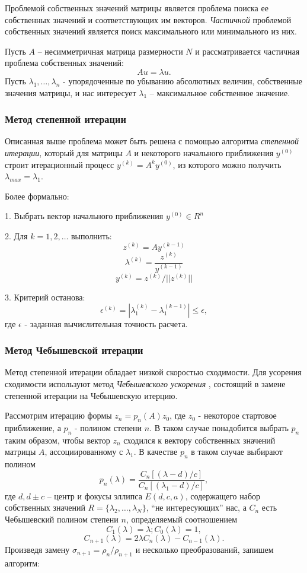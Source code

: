 \documentclass[12pt]{article}
\begin{document}
	Проблемой собственных значений матрицы является проблема поиска ее собственных значений и соответствующих им векторов. {\it Частичной } проблемой собственных значений является поиск максимального или минимального из них.
	
	Пусть $A$ -- несимметричная матрица размерности $N$ и рассматривается частичная проблема собственных значений:
	$$Au=\lambda u.$$
	Пусть $\lambda_1, \dots, \lambda_n$ - упорядоченные по убыванию абсолютных величин, собственные значения матрицы, и нас интересует $\lambda_1$ -- максимальное собственное значение.
	
	\bigskip
	{
		\subsubsection{Метод степенной итерации}
	}
	
	Описанная выше проблема может быть решена с помощью алгоритма {\it степенной итерации}, который для матрицы $A$ и некоторого начального приближения $y^{(0)}$  строит итерационный процесс $y^{(k)}=A^{k}y^{(0)}$, из которого можно получить  $\lambda_{max} = \lambda_1$. 
	
	Более формально:
	
	1. Выбрать вектор начального приближения $y^{(0)} \in R^n$
	
	2. Для $k=1,2, \dots$ выполнить:
		$$z^{(k)}=Ay^{(k-1)}$$
		$$\lambda^{(k)} = \frac{z^{(k)}}{y^{(k-1)}}$$
		$$y^{(k)}=z^{(k)} / ||z^{(k)}||$$

	3. Критерий останова:
		$$\epsilon^{(k)}=|\lambda^{(k)}_1 - \lambda^{(k-1)}_1| \le \epsilon,$$
		где $\epsilon$ - заданная вычислительная точность расчета.
	
	\bigskip
	{
		\subsubsection{Метод Чебышевской итерации}
	}
	
	Метод степенной итерации обладает низкой скоростью сходимости. Для усорения сходимости используют метод {\it Чебышевского ускорения }, состоящий в замене степенной итерации на Чебышевскую итерцию.
	
	Рассмотрим итерацию формы $z_n=p_n(A)z_0$, где $z_0$ - некоторое стартовое приближение, а $p_n$ - полином степени $n$. В таком случае понадобится выбрать $p_n$ таким образом, чтобы вектор $z_n$ сходился к вектору собственных значений матрицы $A$, ассоциированному с $\lambda_1$. В качестве $p_n$ в таком случае выбирают полином
	$$p_n(\lambda) = \frac{C_n[(\lambda-d)/c]}{C_n[(\lambda_1-d)/c]},$$
	где $d, d \pm c$ -- центр и фокусы эллипса $E(d,c,a)$, содержащего набор собственных значений $R=\{ \lambda_2, \dots, \lambda_N \}$, ``не интересующих'' нас, а $C_n$ есть Чебышевский полином степени $n$, определяемый соотношением
	$$C_1(\lambda)=\lambda; C_0(\lambda)=1, $$
	$$C_{n+1}(\lambda) = 2 \lambda C_n(\lambda) - C_{n-1}(\lambda).$$
	Произведя замену $\sigma_{n+1}= \rho_n / \rho_{n+1}$  и несколько преобразований, запишем алгоритм:
	
\end{document}
